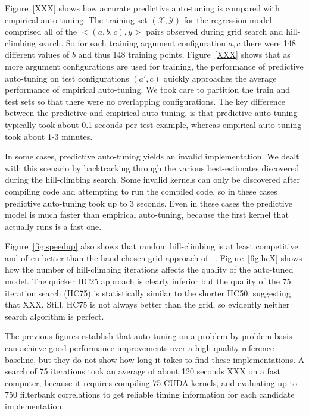 \documentclass{sig-alternate}
\begin{document}

Figure~\ref{XXX} shows how accurate predictive auto-tuning is compared with empirical auto-tuning.
The training set $(\mathcal{X}, \mathcal{Y})$ for the regression model comprised
all of the $<(a,b,c), y>$ pairs observed during grid search and hill-climbing search.
So for each training argument configuration $a,c$ there were 148 different values of $b$ and thus 148 training points.
Figure~\ref{XXX} shows that as more argument configurations are used for training,
the performance of predictive auto-tuning on test configurations $(a', c)$ quickly
approaches the average performance of empirical auto-tuning.
We took care to partition the train and test sets so that there were no overlapping configurations.
The key difference between the predictive and empirical auto-tuning,
is that predictive auto-tuning
typically took about 0.1 seconds per test example, whereas empirical auto-tuning took about 1-3 minutes.

In some cases, predictive auto-tuning yields an invalid implementation.  We
dealt with this scenario by backtracking through the various best-estimates
discovered during the hill-climbing search.  Some invalid kernels can only be
discovered after compiling code and attempting to run the compiled code, so in
these cases predictive auto-tuning took up to 3 seconds.  Even in these cases
the predictive model is much faster than empirical auto-tuning, because the
first kernel that actually runs is a fast one.


Figure~\ref{fig:speedup} also shows that random hill-climbing is at least
competitive and often better than the hand-chosen grid approach of ~\citet{pinto+cox:2011gcg}.  Figure~\ref{fig:hcX} shows how the number of hill-climbing iterations
affects the quality of the auto-tuned model.
The quicker HC25 approach is clearly inferior but the quality of the 75 iteration search (HC75) is statistically similar to the shorter HC50, suggesting that XXX.
Still, HC75 is not always better than the grid, so evidently neither search algorithm is perfect.

The previous figures establish that auto-tuning on a problem-by-problem basis
can achieve good performance improvements over a high-quality reference
baseline, but they do not show how long it takes to find these implementations.
A search of 75 iterations took an average of about 120 seconds XXX on a fast
computer, because it requires compiling 75 CUDA kernels, and evaluating up to
750 filterbank correlations to get reliable timing information for each
candidate implementation.
\end{document}
